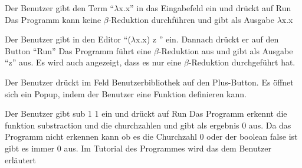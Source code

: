 \documentclass[parskip=full,11pt,twoside]{scrartcl}
\begin{document}
{Der Benutzer gibt den Term \enquote {$\lambda$x.x} in das Eingabefeld ein und drückt auf Run}
{Das Programm kann keine $\beta$-Reduktion durchführen und gibt als Ausgabe $\lambda$x.x}

{ Der Benutzer gibt in den Editor \enquote {($\lambda$x.x) z } ein. Dannach drückt er auf den Button \enquote {Run}}
{ Das Programm führt eine $\beta$-Reduktion aus und gibt als Ausgabe \enquote {z} aus. Es wird auch angezeigt, dass es nur eine $\beta$-Reduktion durchgeführt hat.}






{Der Benutzer drückt im Feld Benutzerbibliothek auf den Plus-Button.}
{Es öffnet sich ein Popup, indem der Benutzer eine Funktion definieren kann.}

{ Der Benutzer gibt sub 1 1 ein und drückt auf Run }
{ Das Programm erkennt die funktion substraction und die churchzahlen und gibt als ergebnis 0 aus. Da das Programm nicht erkennen kann ob es die Churchzahl 0 oder der boolean false ist gibt es immer 0 aus. Im Tutorial des Programmes wird das dem Benutzer erläutert }
\end{document}
